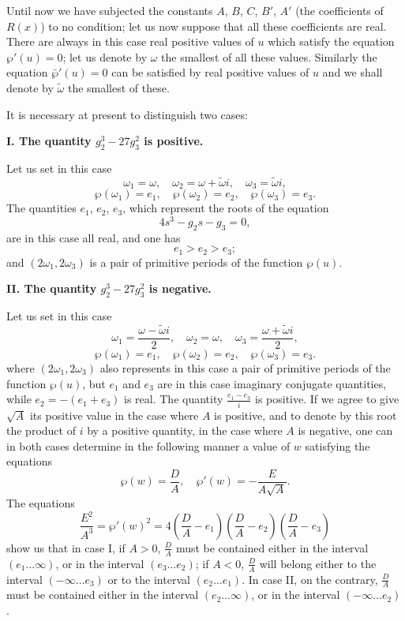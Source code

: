\documentclass{article}
\begin{document}
Until now we have subjected the constants $A$, $B$, $C$, $B'$, $A'$ (the coefficients of $R(x)$) to no condition; let us now suppose that all these coefficients are real. 
There are always in this case real positive values of $u$ which satisfy the equation $\wp'(u) = 0$; let us denote by $\omega$ the smallest of all these values. 
Similarly the equation $\bar{\wp}'(u) = 0$ can be satisfied by real positive values of $u$ and we shall denote by $\tilde{\omega}$ the smallest of these.

It is necessary at present to distinguish two cases:

\textbf{I. The quantity $g_2^3 - 27g_3^2$ is positive.}

Let us set in this case
\[
\omega_1 = \omega, \quad \omega_2 = \omega + \tilde{\omega}i, \quad \omega_3 = \tilde{\omega}i,
\]
\[
\wp(\omega_1) = e_1, \quad \wp(\omega_2) = e_2, \quad \wp(\omega_3) = e_3.
\]
The quantities $e_1$, $e_2$, $e_3$, which represent the roots of the equation
\[
4s^3 - g_2s - g_3 = 0,
\]
are in this case all real, and one has
\[
e_1 > e_2 > e_3;
\]
and $(2\omega_1, 2\omega_3)$ is a pair of primitive periods of the function $\wp(u)$.

\textbf{II. The quantity $g_2^3 - 27g_3^2$ is negative.}

Let us set in this case
\[
\omega_1 = \frac{\omega - \tilde{\omega}i}{2}, \quad \omega_2=\omega, \quad \omega_3 = \frac{\omega + \tilde{\omega}i}{2},
\]
\[
\wp(\omega_1) = e_1, \quad \wp(\omega_2) = e_2, \quad \wp(\omega_3) = e_3.
\]
where $(2\omega_1, 2\omega_3)$ also represents in this case a pair of primitive periods of the function $\wp(u)$, but $e_1$ and $e_3$ are in this case imaginary conjugate quantities, while $e_2 = -(e_1 + e_3)$ is real. The quantity $\frac{e_1 - e_3}{i}$ is positive.
If we agree to give $\sqrt{A}$ its positive value in the case where $A$ is positive, and to denote by this root the product of $i$ by a positive quantity, in the case where $A$ is negative, one can in both cases determine in the following manner a value of $w$ satisfying the equations
\[
\wp(w) = \frac{D}{A}, \quad \wp'(w) = -\frac{E}{A\sqrt{A}}.
\]
The equations
\[
\frac{E^2}{A^3} = \wp'(w)^2 = 4\left(\frac{D}{A} - e_1\right)\left(\frac{D}{A} - e_2\right)\left(\frac{D}{A} - e_3\right)
\]
show us that in case I, if $A > 0$, $\frac{D}{A}$ must be contained either in the interval $(e_1 \ldots \infty)$, or in the interval $(e_3 \ldots e_2)$; if $A < 0$, $\frac{D}{A}$ will belong either to the interval $(-\infty \ldots e_3)$ or to the interval $(e_2 \ldots e_1)$. In case II, on the contrary, $\frac{D}{A}$ must be contained either in the interval $(e_2 \ldots \infty)$, or in the interval $(-\infty \ldots e_2)$.
\end{document}
